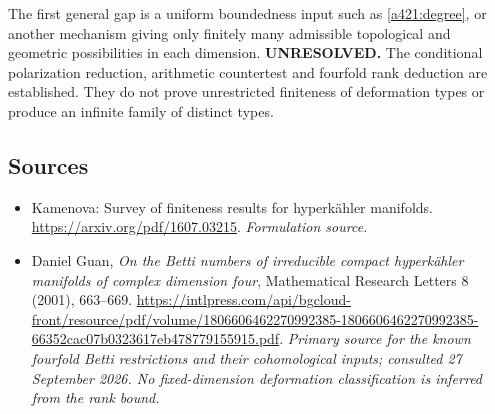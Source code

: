 \documentclass[11pt]{article}
\begin{document}
The first general gap is a uniform
boundedness input such as
\eqref{a421:degree}, or another mechanism
giving only finitely many admissible
topological and geometric possibilities
in each dimension.
\textbf{UNRESOLVED.} The conditional
polarization reduction, arithmetic
countertest and fourfold rank deduction
are established. They do not prove
unrestricted finiteness of deformation
types or produce an infinite family
of distinct types.

\subsection{Sources}
\begin{itemize}
\item[S1]Kamenova: Survey of finiteness results for hyperkähler manifolds.
\url{https://arxiv.org/pdf/1607.03215}.
\textit{Formulation source.}
\item[E1]Daniel Guan, \emph{On the Betti numbers of irreducible compact hyperk\"ahler manifolds of complex dimension four}, Mathematical Research Letters 8 (2001), 663--669.
\url{https://intlpress.com/api/bgcloud-front/resource/pdf/volume/1806606462270992385-1806606462270992385-66352cac07b0323617eb478779155915.pdf}.
\textit{Primary source for the known fourfold Betti restrictions and their cohomological inputs; consulted 27 September 2026. No fixed-dimension deformation classification is inferred from the rank bound.}
\end{itemize}
\end{document}
